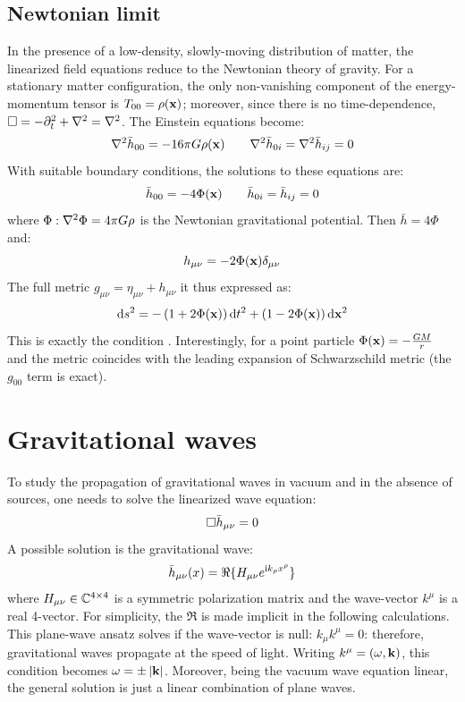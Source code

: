 \subsection{Newtonian limit}

In the presence of a low-density, slowly-moving distribution of matter, the linearized field equations reduce to the Newtonian theory of gravity. For a stationary matter configuration, the only non-vanishing component of the energy-momentum tensor is $ T_{00} = \rho(\mathbf{x}) $; moreover, since there is no time-dependence, $ \Box = -\partial_t^2 + \nabla^2 = \nabla^2 $. The Einstein equations become:
\begin{equation*}
  \nabla^2 \bar{h}_{00} = -16\pi G \rho(\mathbf{x})
  \qquad
  \nabla^2 \bar{h}_{0i} = \nabla^2 \bar{h}_{ij} = 0
\end{equation*}
With suitable boundary conditions, the solutions to these equations are:
\begin{equation*}
  \bar{h}_{00} = -4 \Phi(\mathbf{x})
  \qquad
  \bar{h}_{0i} = \bar{h}_{ij} = 0
\end{equation*}
where $ \Phi : \nabla^2 \Phi = 4\pi G \rho $ is the Newtonian gravitational potential. Then $ \bar{h} = 4 \Phi $ and:
\begin{equation*}
  h_{\mu \nu} = -2\Phi(\mathbf{x}) \delta_{\mu \nu}
\end{equation*}
The full metric $ g_{\mu \nu} = \eta_{\mu \nu} + h_{\mu \nu} $ it thus expressed as:
\begin{equation}
  \mathrm{d} s^2 = - \left( 1 + 2\Phi(\mathbf{x}) \right) \mathrm{d} t^2 + \left( 1 - 2\Phi(\mathbf{x}) \right) \mathrm{d}\mathbf{x}^2
  \label{eq:linear-newtonian}
\end{equation}
This is exactly the condition .
Interestingly, for a point particle $ \Phi(\mathbf{x}) = - \frac{GM}{r} $ and the metric coincides with the leading expansion of Schwarzschild metric (the $ g_{00} $ term is exact).

\newpage
\section{Gravitational waves}

To study the propagation of gravitational waves in vacuum and in the absence of sources, one needs to solve the linearized wave equation:
\begin{equation}
  \Box \bar{h}_{\mu \nu} = 0
  \label{eq:wave}
\end{equation}
A possible solution is the gravitational wave:
\begin{equation}
  \bar{h}_{\mu \nu}(x) = \Re \{ H_{\mu \nu} e^{\mathrm{i} k_\rho x^\rho} \}
  \label{eq:wave-solution}
\end{equation}
where $ H_{\mu \nu} \in \mathbb{C}^{4 \times 4} $ is a symmetric polarization matrix and the wave-vector $ k^\mu $ is a real 4-vector. For simplicity, the $ \Re $ is made implicit in the following calculations. This plane-wave ansatz solves  if the wave-vector is null: $ k_\mu k^\mu = 0 $: therefore, gravitational waves propagate at the speed of light. Writing $ k^\mu = (\omega, \mathbf{k}) $, this condition becomes $ \omega = \pm \left\lvert\mathbf{k}\right\rvert $. Moreover, being the vacuum wave equation linear, the general solution is just a linear combination of plane waves.

